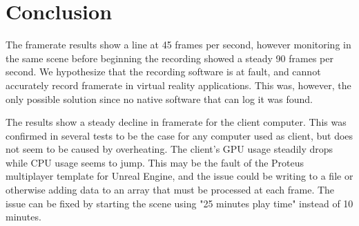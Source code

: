 \section*{Conclusion}
The framerate results show a line at 45 frames per second, however monitoring in the same scene before beginning the recording showed a steady 90 frames per second. We hypothesize that the recording software is at fault, and cannot accurately record framerate in virtual reality applications. This was, however, the only possible solution since no native software that can log it was found. 

The results show a steady decline in framerate for the client computer. This was confirmed in several tests to be the case for any computer used as client, but does not seem to be caused by overheating. The client's GPU usage steadily drops while CPU usage seems to jump. This may be the fault of the Proteus multiplayer template for Unreal Engine, and the issue could be writing to a file or otherwise adding data to an array that must be processed at each frame. The issue can be fixed by starting the scene using "25 minutes play time" instead of 10 minutes.
